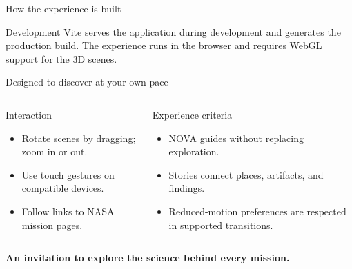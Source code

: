 \documentclass[aspectratio=169,11pt]{beamer}
\begin{document}
\begin{frame}{How the experience is built}
  \centering
  \vspace{0.45cm}
  \begin{block}{Development}
    Vite serves the application during development and generates the production
    build. The experience runs in the browser and requires
    WebGL support for the 3D scenes.
  \end{block}
\end{frame}

\begin{frame}{Designed to discover at your own pace}
  \begin{columns}[T,onlytextwidth]
      \begin{block}{Interaction}
        \begin{itemize}
          \item Rotate scenes by dragging; zoom in or out.
          \item Use touch gestures on compatible devices.
          \item Follow links to NASA mission pages.
        \end{itemize}
      \end{block}
      \begin{block}{Experience criteria}
        \begin{itemize}
          \item NOVA guides without replacing exploration.
          \item Stories connect places, artifacts, and findings.
          \item Reduced-motion preferences are respected in supported transitions.
        \end{itemize}
      \end{block}
  \end{columns}
  \vspace{0.25cm}
  \centering
  {\large\color{cyan}\textbf{An invitation to explore the science behind every mission.}}
\end{frame}
\end{document}
